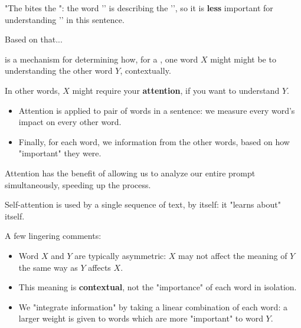         \miniex "The  bites the ": the word '' is describing the '', so it is \textbf{less} important for understanding '' in this sentence.

        Based on that...\\

        \begin{definition}
             is a mechanism for determining how, for a , one word $X$ might might be  to understanding the other word $Y$, contextually.

            In other words, $X$ might require your \textbf{attention}, if you want to understand $Y$.

            \begin{itemize}
                \item Attention is applied to  pair of words in a sentence: we measure every word's impact on every other word.
                \item Finally, for each word, we  information from the other words, based on how "important" they were.
            \end{itemize}

            \subsecdiv

            Attention has the benefit of allowing us to analyze our entire prompt simultaneously, speeding up the process.
        \end{definition}

        Self-attention is used by a single sequence of text, by itself: it "learns about" itself.\\

        \begin{clarification}

            A few lingering comments:
        
            \begin{itemize}
                \item Word $X$ and $Y$ are typically asymmetric: $X$ may not affect the meaning of $Y$ the same way as $Y$ affects $X$.
                \item This meaning is \textbf{contextual}, not the "importance" of each word in isolation.
                \item We "integrate information" by taking a linear combination of each word: a larger weight is given to words which are more "important" to word $Y$.
            \end{itemize}
        \end{clarification}

